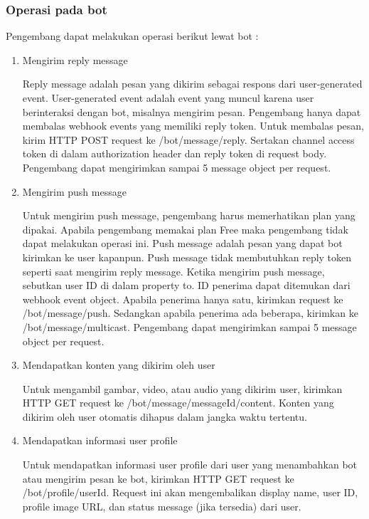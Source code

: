 \subsubsection{Operasi pada bot}
Pengembang dapat melakukan operasi berikut lewat bot :
\begin{enumerate}
\item Mengirim reply message

Reply message adalah pesan yang dikirim sebagai respons dari user-generated event. User-generated event adalah event yang muncul karena user berinteraksi dengan bot, misalnya mengirim pesan. Pengembang hanya dapat membalas webhook events yang memiliki reply token.
Untuk membalas pesan, kirim HTTP POST request ke /bot/message/reply. Sertakan channel access token di dalam authorization header dan reply token di request body. Pengembang dapat mengirimkan sampai 5 message object per request.

\item Mengirim push message

Untuk mengirim push message, pengembang harus memerhatikan plan yang dipakai. Apabila pengembang memakai plan Free maka pengembang tidak dapat melakukan operasi ini. Push message adalah pesan yang dapat bot kirimkan ke user kapanpun. Push message tidak membutuhkan reply token seperti saat mengirim reply message. Ketika mengirim push message, sebutkan user ID di dalam property to. ID penerima dapat ditemukan dari webhook event object. Apabila penerima hanya satu, kirimkan request ke /bot/message/push. Sedangkan apabila penerima ada beberapa, kirimkan ke /bot/message/multicast. Pengembang dapat mengirimkan sampai 5 message object per request.

\item Mendapatkan konten yang dikirim oleh user

Untuk mengambil gambar, video, atau audio yang dikirim user, kirimkan HTTP GET request ke /bot/message/{messageId}/content. Konten yang dikirim oleh user otomatis dihapus dalam jangka waktu tertentu.

\item Mendapatkan informasi user profile

Untuk mendapatkan informasi user profile dari user yang menambahkan bot atau mengirim pesan ke bot, kirimkan HTTP GET request ke /bot/profile/{userId}. Request ini akan mengembalikan display name, user ID, profile image URL, dan status message (jika tersedia) dari user.
\end{enumerate}

